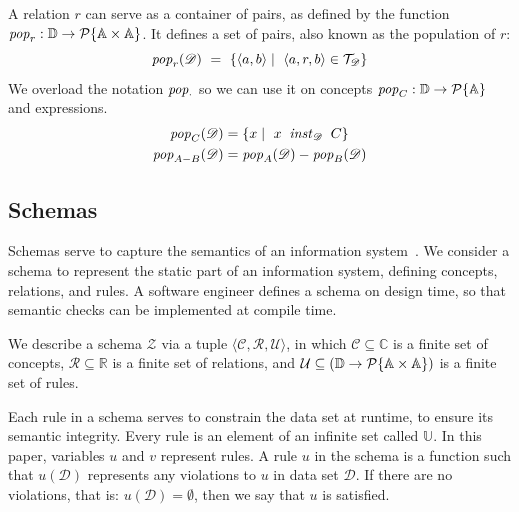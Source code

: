 \documentclass[runningheads]{llncs}
\newcommand{\id}[1]{\text{\it #1\/}}
\newcommand{\popF}[1]{\id{pop}_{#1}}
\newcommand{\pop}[2]{\popF{#1}(#2)}
\newcommand{\instance}{\mathbin{\id{inst}}}
\newcommand{\viol}[2]{{#1}(#2)}
\newcommand{\powerset}[1]{\cal{P}\{#1\}}
\newcommand{\declare}[3]{\id{#1}_{\pair{#2}{#3}}}
\newcommand{\pair}[2]{\langle{#1},{#2}\rangle}
\newcommand{\Pair}[2]{#1\times#2}
\newcommand{\triple}[3]{\langle{#1},{#2},{#3}\rangle}
\newcommand{\Atoms}{\mathbb{A}}
\newcommand{\concepts}{\mathcal{C}}
\newcommand{\Concepts}{\mathbb{C}}
\newcommand{\rels}{\mathcal{R}}   %
\newcommand{\Rels}{\mathbb{R}}   %
\newcommand{\triples}{\mathcal{T}}
\newcommand{\rules}{\mathcal{U}}
\newcommand{\Rules}{\mathbb{U}}
\newcommand{\dataset}{\mathscr{D}}
\newcommand{\Dataset}{\mathbb{D}}
\newcommand{\schema}{\mathscr{Z}}
\begin{document}
   A relation $r$ can serve as a container of pairs,
   as defined by the function $\popF{r}:\Dataset\rightarrow\powerset{\Pair{\Atoms}{\Atoms}}$.
   It defines a set of pairs, also known as the population of $r$:
\begin{equation}
   \pop{r}{\dataset}\ =\ \{ \pair{a}{b}\mid\ \triple{a}{r}{b}\in\triples_{\dataset}\}
\label{eqn:pop-rel}
\end{equation}
%
   We overload the notation $\popF{\cdot}$ so we can use it on concepts $\popF{C}:\Dataset\rightarrow\powerset{\Atoms}$
   and expressions.
\begin{align}
   \pop{C}{\dataset}&= \{ x\mid\ x\ \instance_{\dataset}\ C\}
\label{eqn:pop-concept}\\
   \pop{A - B}{\dataset}&= \pop{A}{\dataset} - \pop{B}{\dataset}
\label{eqn:pop-expr}
\end{align}

\subsection{Schemas}
\label{sct:Schemas}
   Schemas serve to capture the semantics of an information system~\cite{Spivak2012}.
   We consider a schema to represent the static part of an information system, defining concepts, relations, and rules.
   A software engineer defines a schema on design time, so that semantic checks can be implemented at compile time.

   We describe a schema $\schema$ via a tuple $\triple{\concepts}{\rels}{\rules}$,
   in which $\concepts\subseteq \Concepts$ is a finite set of concepts,
   $\rels\subseteq \Rels$ is a finite set of relations,
   and $\rules\subseteq \left(\Dataset \to \powerset{\Pair{\Atoms}{\Atoms}}\right)$ is a finite set of rules.
   
   Each rule in a schema serves to constrain the data set at runtime, to ensure its semantic integrity.
   Every rule is an element of an infinite set called $\Rules$.
   In this paper, variables $u$ and $v$ represent rules.
   A rule $u$ in the schema is a function such that $\viol{u}{\dataset}$ represents any violations to $u$ in data set $\dataset$.
   If there are no violations, that is: $\viol{u}{\dataset} = \emptyset{}$, then we say that $u$ is satisfied.
   
\end{document}
